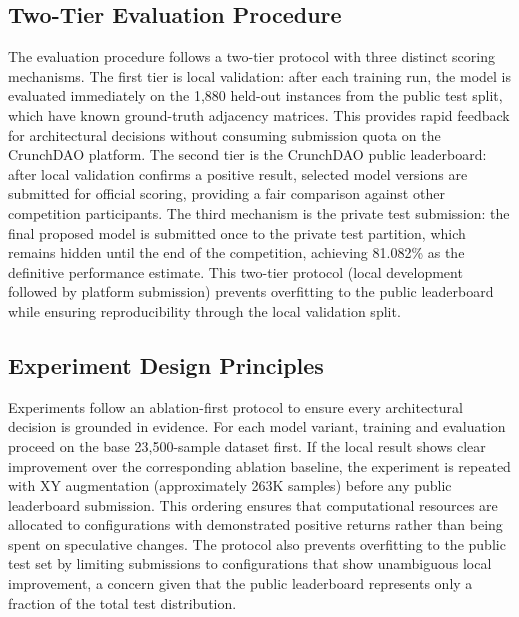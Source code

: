 \subsection{Two-Tier Evaluation Procedure}
\label{sec:evaluation_procedure}

The evaluation procedure follows a two-tier protocol with three distinct scoring mechanisms. The first tier is local validation: after each training run, the model is evaluated immediately on the 1,880 held-out instances from the public test split, which have known ground-truth adjacency matrices. This provides rapid feedback for architectural decisions without consuming submission quota on the CrunchDAO platform. The second tier is the CrunchDAO public leaderboard: after local validation confirms a positive result, selected model versions are submitted for official scoring, providing a fair comparison against other competition participants. The third mechanism is the private test submission: the final proposed model is submitted once to the private test partition, which remains hidden until the end of the competition, achieving 81.082\% as the definitive performance estimate. This two-tier protocol (local development followed by platform submission) prevents overfitting to the public leaderboard while ensuring reproducibility through the local validation split.

\subsection{Experiment Design Principles}
\label{sec:design_principles}

Experiments follow an ablation-first protocol to ensure every architectural decision is grounded in evidence. For each model variant, training and evaluation proceed on the base 23,500-sample dataset first. If the local result shows clear improvement over the corresponding ablation baseline, the experiment is repeated with XY augmentation (approximately 263K samples) before any public leaderboard submission. This ordering ensures that computational resources are allocated to configurations with demonstrated positive returns rather than being spent on speculative changes. The protocol also prevents overfitting to the public test set by limiting submissions to configurations that show unambiguous local improvement, a concern given that the public leaderboard represents only a fraction of the total test distribution.

